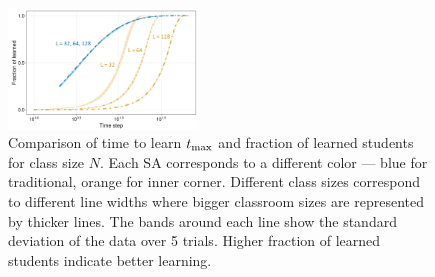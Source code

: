 \documentclass[twocolumn,secnumarabic,amssymb, nobibnotes, aps, prd]{revtex4-2}
\begin{document}
        \begin{figure}[htbp!]
            \centering
            \includegraphics[width=0.45\textwidth]{figures/2D-BPCAIH-analysis/comparison plots/size.png}
            \caption{Comparison of time to learn $t_{\rm max}$ and fraction of learned students for class size $N$.
            Each SA corresponds to a different color --- blue for traditional, orange for inner corner.
            Different class sizes correspond to different line widths where bigger classroom sizes are represented by thicker lines.
            The bands around each line show the standard deviation of the data over 5 trials.
            Higher fraction of learned students indicate better learning.}
            \label{fig:comparison size}
        \end{figure}

\end{document}
